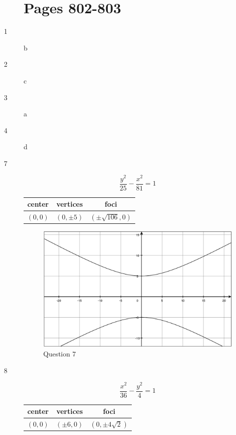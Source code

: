 \documentclass[fleqn,addpoints]{exam}
\begin{document}
\begin{description}
\section{Pages 802-803}

\item[1]
b

\item[2]
c

\item[3]
a

\item[4]
d

\item[7]
\[
  \frac{y^2}{25} - \frac{x^2}{81} = 1
\]

\begin{tabular}{ccc}
\toprule
center & vertices & foci \\
\midrule
  $(0, 0)$ & $(0, \pm 5)$ & $(\pm \sqrt{106}, 0)$ \\
\bottomrule
\end{tabular}

\begin{figure}[H]
  \centering
  \includegraphics[scale=.3]{p802_7.eps}
  \caption*{Question 7}
\end{figure}

\item[8]
\[
  \frac{x^2}{36} - \frac{y^2}{4} = 1
\]

\begin{tabular}{ccc}
\toprule
center & vertices & foci \\
\midrule
  $(0, 0)$ & $(\pm 6, 0)$ & $(0, \pm 4 \sqrt{2})$ \\
\bottomrule
\end{tabular}


\end{description}
\end{document}
